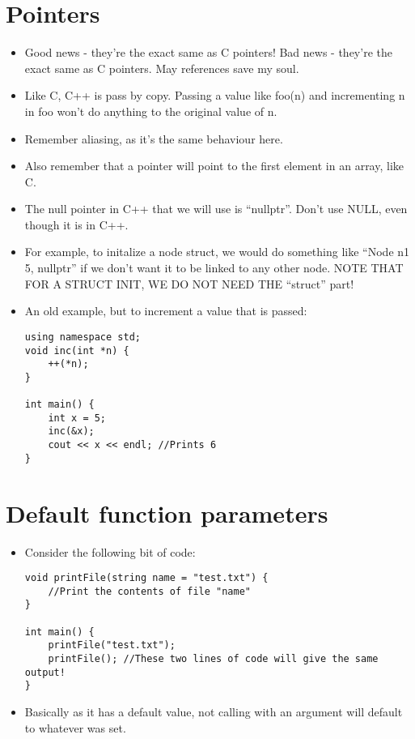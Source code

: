 \documentclass{article}
\begin{document}
\section{Pointers}
\begin{itemize}
\item Good news - they're the exact same as C pointers!  Bad news - they're the exact same as C pointers.  May references save my soul.
\item Like C, C++ is pass by copy.  Passing a value like foo(n) and incrementing n in foo won't do anything to the original value of n.
\item Remember aliasing, as it's the same behaviour here.
\item Also remember that a pointer will point to the first element in an array, like C.
\item The null pointer in C++ that we will use is ``nullptr''.  Don't use NULL, even though it is in C++.
\item For example, to initalize a node struct, we would do something like ``Node n1 {5, nullptr}'' if we don't want it to be linked to any other node.  NOTE THAT FOR A STRUCT INIT, WE DO NOT NEED THE ``struct'' part!
\item An old example, but to increment a value that is passed:
\begin{lstlisting}
using namespace std;
void inc(int *n) {
    ++(*n);
}

int main() {
    int x = 5;
    inc(&x);
    cout << x << endl; //Prints 6
}
\end{lstlisting}
\end{itemize}

\section{Default function parameters}
\begin{itemize}
\item Consider the following bit of code:
\begin{lstlisting}
void printFile(string name = "test.txt") {
    //Print the contents of file "name"
}

int main() {
    printFile("test.txt");
    printFile(); //These two lines of code will give the same output!
}
\end{lstlisting}
\item Basically as it has a default value, not calling with an argument will default to whatever was set.
\end{itemize}
\end{document}
